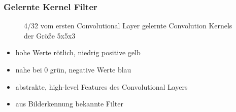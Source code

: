 \documentclass{beamer}
\begin{document}
\begin{frame}
	\frametitle{Gelernte Kernel Filter}
	\begin{figure}
	\caption{4/32 vom ersten Convolutional Layer gelernte Convolution Kernels der Größe 5x5x3}
	\label{fig:kernel}
	\end{figure}
	\begin{itemize}
		\item hohe Werte rötlich, niedrig positive gelb
		\item nahe bei 0 grün, negative Werte blau 
		\item abstrakte, high-level Features des Convolutional Layers
		\item aus Bilderkennung bekannte Filter
	\end{itemize}
\end{frame}
\end{document}
